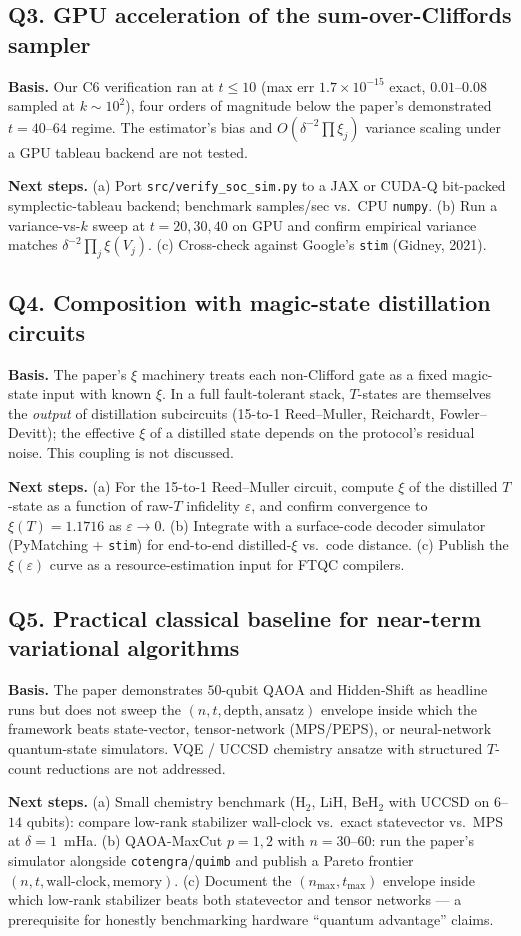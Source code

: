 \subsection*{Q3. GPU acceleration of the sum-over-Cliffords sampler}
\textbf{Basis.} Our C6 verification ran at $t \leq 10$ (max err $1.7 \times 10^{-15}$
exact, $0.01$--$0.08$ sampled at $k \sim 10^2$), four orders of magnitude below the
paper's demonstrated $t = 40$--$64$ regime. The estimator's bias and $O(\delta^{-2}
\prod \xi_j)$ variance scaling under a GPU tableau backend are not tested.

\textbf{Next steps.} (a) Port \texttt{src/verify\_soc\_sim.py} to a JAX or CUDA-Q
bit-packed symplectic-tableau backend; benchmark samples/sec vs.\ CPU \texttt{numpy}.
(b) Run a variance-vs-$k$ sweep at $t = 20, 30, 40$ on GPU and confirm empirical
variance matches $\delta^{-2} \prod_j \xi(V_j)$. (c) Cross-check against Google's
\texttt{stim} (Gidney, 2021).

\subsection*{Q4. Composition with magic-state distillation circuits}
\textbf{Basis.} The paper's $\xi$ machinery treats each non-Clifford gate as a fixed
magic-state input with known $\xi$. In a full fault-tolerant stack, $T$-states are
themselves the \emph{output} of distillation subcircuits (15-to-1 Reed--Muller,
Reichardt, Fowler--Devitt); the effective $\xi$ of a distilled state depends on the
protocol's residual noise. This coupling is not discussed.

\textbf{Next steps.} (a) For the 15-to-1 Reed--Muller circuit, compute $\xi$ of the
distilled $T$-state as a function of raw-$T$ infidelity $\varepsilon$, and confirm
convergence to $\xi(T) = 1.1716$ as $\varepsilon \to 0$. (b) Integrate with a
surface-code decoder simulator (PyMatching + \texttt{stim}) for end-to-end
distilled-$\xi$ vs.\ code distance. (c) Publish the $\xi(\varepsilon)$ curve as a
resource-estimation input for FTQC compilers.

\subsection*{Q5. Practical classical baseline for near-term variational algorithms}
\textbf{Basis.} The paper demonstrates $50$-qubit QAOA and Hidden-Shift as headline
runs but does not sweep the $(n, t, \text{depth}, \text{ansatz})$ envelope inside
which the framework beats state-vector, tensor-network (MPS/PEPS), or neural-network
quantum-state simulators. VQE / UCCSD chemistry ansatze with structured $T$-count
reductions are not addressed.

\textbf{Next steps.} (a) Small chemistry benchmark (H$_2$, LiH, BeH$_2$ with UCCSD
on $6$--$14$ qubits): compare low-rank stabilizer wall-clock vs.\ exact statevector
vs.\ MPS at $\delta = 1$~mHa. (b) QAOA-MaxCut $p = 1, 2$ with $n = 30$--$60$: run
the paper's simulator alongside \texttt{cotengra}/\texttt{quimb} and publish a Pareto
frontier $(n, t, \text{wall-clock}, \text{memory})$. (c) Document the
$(n_{\max}, t_{\max})$ envelope inside which low-rank stabilizer beats both
statevector and tensor networks --- a prerequisite for honestly benchmarking
hardware ``quantum advantage'' claims.
